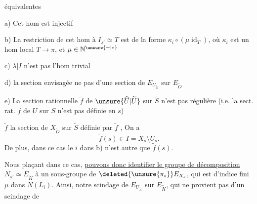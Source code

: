 équivalentes

a) Cet hom est injectif

b) La restriction de cet hom à $I_{s'}\simeq T$ est de la forme $\kappa_i\circ(\mu\operatorname{id}_T)$, où $\kappa_i$ est un hom local $T\longrightarrow\pi$, et $\mu\in\mathbb N^{\unsure{+|*}}$

c) $\lambda\vert I$ n'est pas l'hom trivial

d) la section envisagée  ne  pas d'une section de $E_{U_{\widetilde O}}$ sur $E_{\widetilde O}$

e) La section rationnelle  $\widetilde f$ de $\unsure{\widehat U|\widetilde U}$ sur $\widetilde S$ n'est pas régulière (i.e. la sect. rat. $f$ de $U$ sur $S$ n'est pas définie en $s$)

  $\widetilde f$  la section de $X_{\widetilde O}$ sur $\widetilde S$ définie par $\widetilde f$ ,  On a
\[
\widetilde f(s)\in I=X_s\setminus U_s.
\]
De plus, dans ce cas le $i$ dans b) n'est autre que $\widetilde f(s)$.

Nous plaçant dans ce cas, \uline{ pouvons donc identifier le groupe de décomposition} $N_{s'}\simeq E_{\widetilde K}$ à un sous-groupe de $\deleted{\unsure{\pi_s}}E_{X_s}$,  qui est d'indice fini $\mu$ dans  $N(L_i)$. Ainsi, notre scindage de  $E_{U_{\widetilde K}}$  sur $E_{\widetilde K}$, qui ne provient pas d'un scindage de
